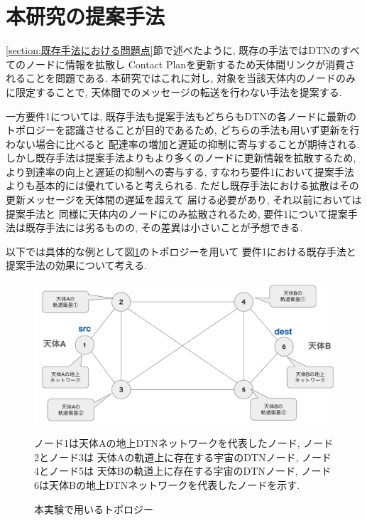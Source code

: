 \section{本研究の提案手法}
\label{section:要件1における既存手法と提案手法の比較}
\ref{section:既存手法における問題点}節で述べたように, 既存の手法ではDTNのすべてのノードに情報を拡散し
Contact Planを更新するため天体間リンクが消費されることを問題である.   
本研究ではこれに対し, 対象を当該天体内のノードのみに限定することで, 天体間でのメッセージの転送を行わない手法を提案する.

一方要件1については, 既存手法も提案手法もどちらもDTNの各ノードに最新の
トポロジーを認識させることが目的であるため,
どちらの手法も用いず更新を行わない場合に比べると
配達率の増加と遅延の抑制に寄与することが期待される.
しかし既存手法は提案手法よりもより多くのノードに更新情報を拡散するため,
より到達率の向上と遅延の抑制への寄与する, 
すなわち要件1において提案手法よりも基本的には優れていると考えられる. 
ただし既存手法における拡散はその更新メッセージを天体間の遅延を超えて
届ける必要があり, それ以前においては提案手法と
同様に天体内のノードにのみ拡散されるため, 
要件1について提案手法は既存手法には劣るものの, その差異は小さいことが予想できる. 

以下では具体的な例として図\ref{fig:experimentation_topology}のトポロジーを用いて
要件1における既存手法と提案手法の効果について考える.

\begin{figure}[tbh]
    \centering
    \includegraphics[width=0.7\textheight]{img/thesis_Sample_topology.pdf}
    \caption{本実験で用いるトポロジー}
    \label{fig:experimentation_topology}
    \begin{minipage}{\textwidth}
        \raggedright
        \vspace{3mm}
        \fontsize{10.5pt}{12pt}\selectfont
        ノード1は天体Aの地上DTNネットワークを代表したノード, ノード2とノード3は
        天体Aの軌道上に存在する宇宙のDTNノード, ノード4とノード5は
        天体Bの軌道上に存在する宇宙のDTNノード, 
        ノード6は天体Bの地上DTNネットワークを代表したノードを示す. 
    \end{minipage}
\end{figure}

